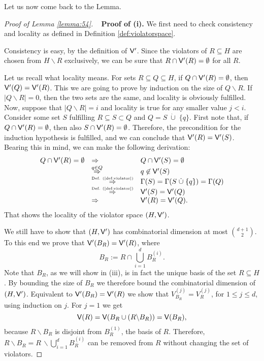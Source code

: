 \documentclass[12pt]{article}
\def\Violators{{\sf V}}
\theoremstyle{remark}
\begin{document}
    Let us now come back to the Lemma.
    \begin{proof}[Proof of Lemma \ref{lemma:54}]
    ~\newline
     \textbf{Proof of (i).}
    We first need to check consistency and locality as defined in Definition \ref{def:violatorspace}.
    
    Consistency is easy, by the definition of $\Violators'$. Since the violators of $R\subseteq H$ are 
chosen
    from $H\backslash R$ exclusively, we can be sure that $R\cap \Violators'(R)=\emptyset$ for all $R
$.
    
    Let us recall what locality means. For sets $R\subseteq Q \subseteq H$, if $Q\cap\Violators'(R) = 
\emptyset$, then
    $\Violators'(Q) = \Violators'(R)$. This we are going to prove by induction on the size of $Q
\backslash R$.
    If $|Q\backslash R| = 0$, then the two sets are the same, and locality is obviously fulfilled. Now, 
suppose
    that $|Q\backslash R| = i$ and locality is true for any smaller value $j<i$. Consider some set $S$ 
fulfilling
    $R\subseteq S \subset Q$ and $Q=S\;\dot{\cup}\;\{q\}$. 
    First note that, if $Q\cap \Violators'(R) = \emptyset$, then also $S\cap \Violators'(R)= \emptyset$.
    Therefore, the precondition for the induction hypothesis is fulfilled, and we can conclude that
    $\Violators'(R) = \Violators'(S)$.  Bearing this in mind, we can make the following derivation:
    \[
    \begin{array}{lll}
    Q \cap \Violators'(R) = \emptyset &
    \Rightarrow &  Q \cap \Violators'(S) = \emptyset \\
    & \stackrel{q\in Q}{\Rightarrow} & q\not\in \Violators'(S) \\
    & \stackrel{\mbox{\tiny Def. (\ref{def:violator})}}{\Rightarrow} & \Gamma(S) = \Gamma(S\;\dot{\cup}\; \{q\}) = \Gamma(Q)\\
    & \stackrel{\mbox{\tiny Def. (\ref{def:violator})}}{\Rightarrow} & \Violators'(S) = \Violators'(Q) \\
    & \Rightarrow & \Violators'(R) = \Violators'(Q).
    \end{array}
    \]
    That shows the locality of the violator space $(H, \Violators')$.
    
    We still have to show that $(H, \Violators')$  has combinatorial dimension at most ${d+1 \choose 
2}$.
    To this end we prove that $\Violators'(B_{R}) = \Violators'(R)$, where
    \[
    	B_{R}:= R\cap \bigcup_{i=1}^{d} B_{R}^{(i)}.
    \]
     Note that $B_{R}$, as we will show in {(iii)}, is in fact the unique basis of the set $R\subseteq H$.
     By bounding the size of $B_R$ we therefore bound the combinatorial dimension of
    $(H, \Violators')$. 
     Equivalent to  $\Violators'(B_{R}) = \Violators'(R)$ we show that $V_{B_{R}}^{(j)} = V_{R}^{(j)}$, for $1\leq j \leq d$, using induction on $j
$. For
    $j=1$ we get
    \[
    	\Violators(R) = \Violators(B_{R}\cup (R\backslash B_{R})) = \Violators(B_{R}),
    \]
    because $R\backslash B_{R}$ is disjoint from $B_{R}^{(1)}$, the basis of $R$. Therefore,
    $R\backslash B_{R}=R\,\backslash  \bigcup_{i=1}^{d} B_{R}^{(i)}$
    can be removed from $R$ without changing the set of violators.
    

\end{proof}
\end{document}
